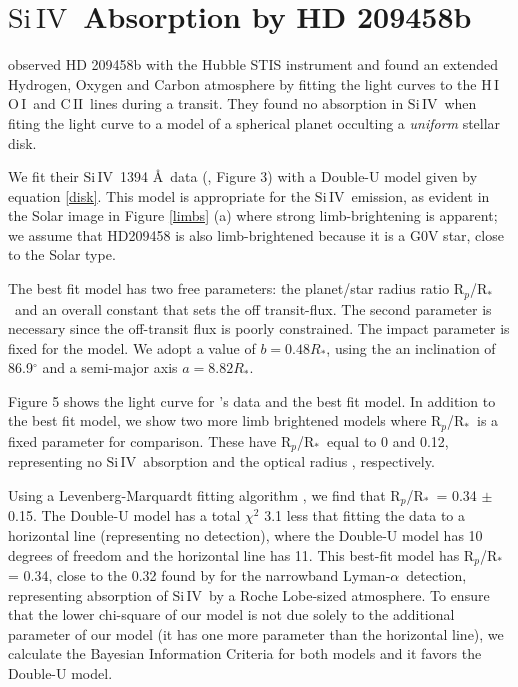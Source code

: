 \documentclass[twocolumn]{emulateapj}
\newcommand{\cii}{\ensuremath{\mathrm{C}\,\scriptstyle \mathrm{II}}}
\newcommand{\oi}{\ensuremath{\mathrm{O}\,\scriptstyle \mathrm{I}}}
\newcommand{\hi}{\ensuremath{\mathrm{H}\,\scriptstyle \mathrm{I}}}
\newcommand{\siIV}{\ensuremath{\mathrm{Si}\,\scriptstyle \mathrm{IV}}}
\newcommand{\p}{R$_p$/R$_*$}
\newcommand{\lya}{Lyman-$\alpha$}
\begin{document}
\section{\siIV\ Absorption by HD 209458b} \label{osiris}

\citet{viddisc} observed HD 209458b with the Hubble STIS instrument and found
an extended Hydrogen, Oxygen and Carbon atmosphere by fitting the light curves
to the \hi\, \oi\ and \cii\ lines during a transit. They found no absorption in \siIV\ when fiting the light curve to a model of a spherical planet occulting a {\it uniform} stellar disk.

We fit their \siIV\ 1394 \AA\ data (\citet{vidmad}, Figure 3) with a Double-U model given by equation \ref{disk}. This model is appropriate for the \siIV\ emission, as evident in the Solar image in Figure \ref{limbs} (a) where strong limb-brightening is apparent; we assume that HD209458 is also limb-brightened because it is a G0V star, close to the Solar type.

The best fit model has two free parameters: the planet/star radius ratio \p\ and an overall constant that sets the off transit-flux. The second parameter is necessary since the off-transit flux is poorly constrained. The impact parameter 
 is fixed for the model. We adopt a value of $ b= 0.48 R_*$, using the an inclination of 86.9$^\circ$ \citep{knutsonprop} and a semi-major axis $a=8.82 R_*$.

Figure 5
 shows the light curve for \citet{vidmad}'s data and the best fit model. In addition to the best fit model, we show two more limb brightened models where \p\ is a fixed parameter for comparison. These have \p\ equal to 0 and 0.12, representing no \siIV\ absorption and the optical radius \citep{knutsonprop}, respectively.

Using a Levenberg-Marquardt fitting algorithm \citep{mpfit}, we find that \p\ = 0.34 $\pm$ 0.15. 
The Double-U model has a total $\chi^2$ 3.1 less that fitting the data to
a horizontal line (representing no detection), where the Double-U model has 10 degrees of freedom and the horizontal line has 11. This best-fit model has
R$_p$/R$_*$ = 0.34, close to the 0.32 found by \citet{vidmad} for the narrowband \lya\ detection, representing absorption of \siIV\ by a Roche Lobe-sized atmosphere. To ensure that the lower chi-square of our model is not due solely to the additional parameter of our model (it has one more parameter than the horizontal line), we calculate the Bayesian Information Criteria for both models and it favors the Double-U model.
\end{document}
